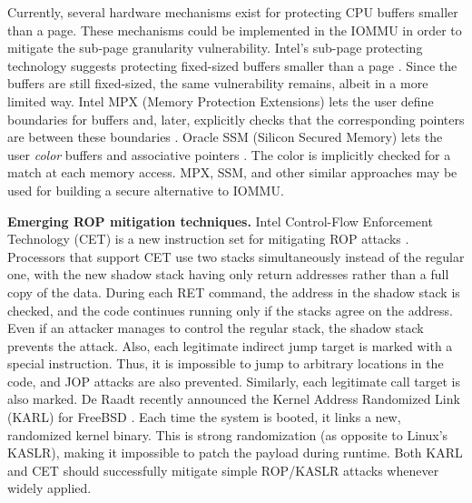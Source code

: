 Currently, several hardware mechanisms exist for protecting CPU buffers smaller than a page. These mechanisms could be implemented in the IOMMU in order to mitigate the sub-page granularity vulnerability. Intel’s sub-page protecting technology suggests protecting fixed-sized buffers smaller than a page \cite{Int18}. Since the buffers are still fixed-sized, the same vulnerability remains, albeit in a more limited way. Intel MPX (Memory Protection Extensions) lets the user define boundaries for buffers and, later, explicitly checks that the corresponding pointers are between these boundaries \cite{Int16a}. Oracle SSM (Silicon Secured Memory) lets the user \emph{color} buffers and associative pointers \cite{Ora15}. The color is implicitly checked for a match at each memory access. MPX, SSM, and other similar approaches may be used for building a secure alternative to IOMMU. 

\smallskip
\noindent\textbf{Emerging ROP mitigation techniques.}
Intel Control-Flow Enforcement Technology (CET) is a new instruction set for mitigating ROP attacks \cite{Int17}. Processors that support CET use two stacks simultaneously instead of the regular one, with the new shadow stack having only return addresses rather than a full copy of the data. During each RET command, the address in the shadow stack is checked, and the code continues running only if the stacks agree on the address. Even if an attacker manages to control the regular stack, the shadow stack prevents the attack. Also, each legitimate indirect jump target is marked with a special instruction. Thus, it is impossible to jump to arbitrary locations in the code, and JOP attacks are also prevented. Similarly, each legitimate call target is also marked. De Raadt recently announced the Kernel Address Randomized Link (KARL) for FreeBSD \cite{dr17}. Each time the system is booted, it links a new, randomized kernel binary. This is strong randomization (as opposite to Linux’s KASLR), making it impossible to patch the payload during runtime. Both KARL and CET should successfully mitigate simple ROP/KASLR attacks whenever widely applied.